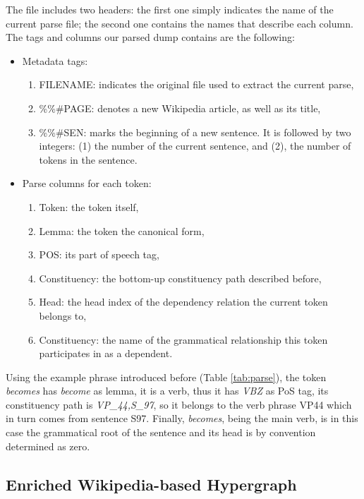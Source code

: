 The file includes two headers: the first one simply indicates the name of the current parse file; the second one contains the names that describe each column. The tags and columns our parsed dump contains are the following:
\begin{itemize}
\item Metadata tags:
\begin{enumerate}
\item {FILENAME}: indicates the original file used to extract the current parse, 
\item {\%\%\#PAGE}: denotes a new Wikipedia article, as well as its title, 
\item {\%\%\#SEN}: marks the beginning of a new sentence. It is followed by two integers: (1) the number of the current sentence, and (2), the number of tokens in the sentence.

\end{enumerate}

\item Parse columns for each token:
\begin{enumerate}
\item Token: the token itself,
\item Lemma: the token the canonical form,
\item POS: its part of speech tag,
\item Constituency: the bottom-up constituency path described before,
\item Head: the head index of the dependency relation the current token belongs to,
\item Constituency: the name of the grammatical relationship this token participates in as a dependent.
\end{enumerate}
\end{itemize}

Using the example phrase introduced before (Table \ref{tab:parse}), the token \textit{becomes} has \textit{become} as lemma, it is a verb, thus it has \textit{VBZ} as PoS tag, its constituency path is \textit{VP\_44,S\_97}, so it belongs to the verb phrase {VP44} which in turn comes from sentence {S97}. Finally, \textit{becomes}, being the main verb, is in this case the grammatical root of the sentence and its head is by convention determined as  zero. 

\subsection{Enriched Wikipedia-based Hypergraph}


